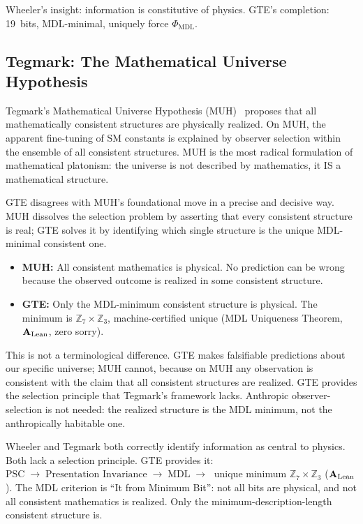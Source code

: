 \documentclass[11pt,openany]{book}
\theoremstyle{remark}
\newcommand{\MDL}{\text{MDL}}
\newcommand{\PSC}{\text{PSC}}
\newcommand{\PHIMDL}{\Phi_{\mathrm{MDL}}}
\newcommand{\ZS}{\mathbb{Z}_7}
\newcommand{\CatAL}{\ensuremath{\textbf{A}_{\rm Lean}}}
\begin{document}
Wheeler's insight: information is constitutive of physics.  GTE's completion: 19~bits,
MDL-minimal, uniquely force $\PHIMDL$.

\subsection*{Tegmark: The Mathematical Universe Hypothesis}

Tegmark's Mathematical Universe Hypothesis (MUH)~\cite{Tegmark2008} proposes that all
mathematically consistent structures are physically realized.  On MUH, the apparent
fine-tuning of SM constants is explained by observer selection within the ensemble of all
consistent structures.  MUH is the most radical formulation of mathematical platonism:
the universe is not described by mathematics, it IS a mathematical structure.

GTE disagrees with MUH's foundational move in a precise and decisive way.  MUH dissolves
the selection problem by asserting that every consistent structure is real; GTE solves it
by identifying which single structure is the unique MDL-minimal consistent one.

\begin{itemize}
\item \textbf{MUH:} All consistent mathematics is physical.  No prediction can be wrong
  because the observed outcome is realized in some consistent structure.
\item \textbf{GTE:} Only the MDL-minimum consistent structure is physical.  The minimum
  is $\ZS\times\mathbb{Z}_3$, machine-certified unique (MDL Uniqueness Theorem, \CatAL, zero sorry).
\end{itemize}

This is not a terminological difference.  GTE makes falsifiable predictions about our
specific universe; MUH cannot, because on MUH any observation is consistent with the
claim that all consistent structures are realized.  GTE provides the selection principle
that Tegmark's framework lacks.  Anthropic observer-selection is not needed: the realized
structure is the MDL minimum, not the anthropically habitable one.

\begin{tcolorbox}[colback=green!5,colframe=green!50!black,
  title={The Common Theme and GTE's Resolution}]
Wheeler and Tegmark both correctly identify information as central to physics.  Both lack
a selection principle.  GTE provides it: $\PSC\;\to\;\text{Presentation Invariance}\;\to\;
\MDL\;\to\;$ unique minimum $\ZS\times\mathbb{Z}_3$ (\CatAL).  The MDL criterion is
``It from Minimum Bit'': not all bits are physical, and not all consistent mathematics is
realized.  Only the minimum-description-length consistent structure is.
\end{tcolorbox}
\end{document}
